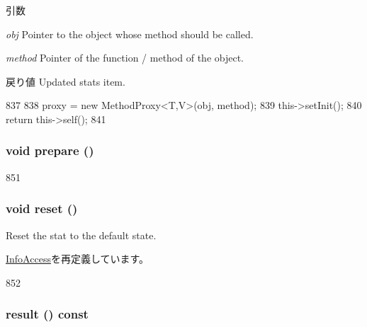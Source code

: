 \begin{DoxyParams}{引数}
\item[{\em obj}]Pointer to the object whose method should be called. \item[{\em method}]Pointer of the function / method of the object. \end{DoxyParams}
\begin{DoxyReturn}{戻り値}
Updated stats item. 
\end{DoxyReturn}



\begin{DoxyCode}
837     {
838         proxy = new MethodProxy<T,V>(obj, method);
839         this->setInit();
840         return this->self();
841     }
\end{DoxyCode}
\hypertarget{classStats_1_1ValueBase_a1825b40ca3bc3a1ba67fdb58fac5015c}{
\subsubsection[{prepare}]{\setlength{\rightskip}{0pt plus 5cm}void prepare ()}}
\label{classStats_1_1ValueBase_a1825b40ca3bc3a1ba67fdb58fac5015c}



\begin{DoxyCode}
851 { }
\end{DoxyCode}
\hypertarget{classStats_1_1ValueBase_ad20897c5c8bd47f5d4005989bead0e55}{
\subsubsection[{reset}]{\setlength{\rightskip}{0pt plus 5cm}void reset ()}}
\label{classStats_1_1ValueBase_ad20897c5c8bd47f5d4005989bead0e55}
Reset the stat to the default state. 

\hyperlink{classStats_1_1InfoAccess_ad20897c5c8bd47f5d4005989bead0e55}{InfoAccess}を再定義しています。


\begin{DoxyCode}
852 { }
\end{DoxyCode}
\hypertarget{classStats_1_1ValueBase_ae050da86c3d8e8a677a0bdeb7971e1e3}{
\subsubsection[{result}]{ result () const}}
\label{classStats_1_1ValueBase_ae050da86c3d8e8a677a0bdeb7971e1e3}



